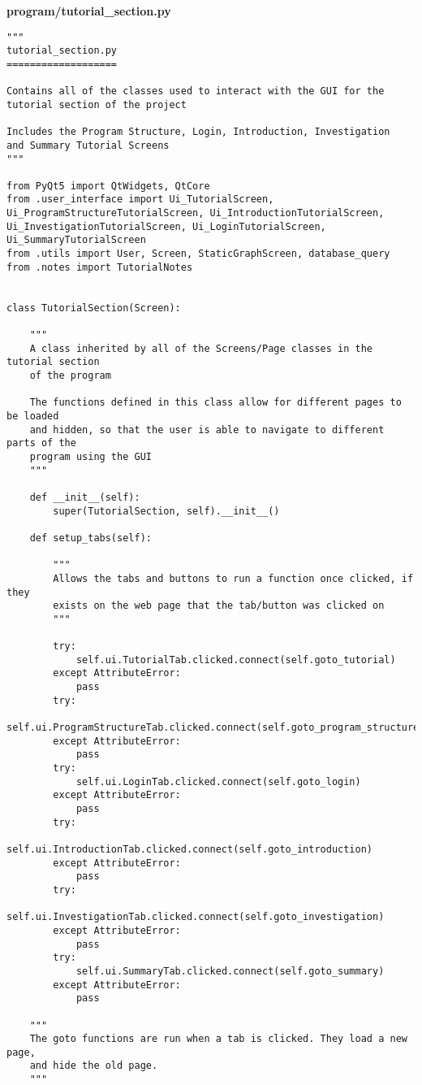 \documentclass{article}
\begin{document}
\textbf{program/tutorial\_section.py}

\begin{lstlisting}
"""
tutorial_section.py
===================

Contains all of the classes used to interact with the GUI for the
tutorial section of the project

Includes the Program Structure, Login, Introduction, Investigation
and Summary Tutorial Screens
"""

from PyQt5 import QtWidgets, QtCore
from .user_interface import Ui_TutorialScreen, Ui_ProgramStructureTutorialScreen, Ui_IntroductionTutorialScreen, Ui_InvestigationTutorialScreen, Ui_LoginTutorialScreen, Ui_SummaryTutorialScreen
from .utils import User, Screen, StaticGraphScreen, database_query
from .notes import TutorialNotes


class TutorialSection(Screen):

    """
    A class inherited by all of the Screens/Page classes in the tutorial section
    of the program

    The functions defined in this class allow for different pages to be loaded
    and hidden, so that the user is able to navigate to different parts of the
    program using the GUI
    """

    def __init__(self):
        super(TutorialSection, self).__init__()

    def setup_tabs(self):

        """
        Allows the tabs and buttons to run a function once clicked, if they
        exists on the web page that the tab/button was clicked on
        """

        try:
            self.ui.TutorialTab.clicked.connect(self.goto_tutorial)
        except AttributeError:
            pass
        try:
            self.ui.ProgramStructureTab.clicked.connect(self.goto_program_structure)
        except AttributeError:
            pass
        try:
            self.ui.LoginTab.clicked.connect(self.goto_login)
        except AttributeError:
            pass
        try:
            self.ui.IntroductionTab.clicked.connect(self.goto_introduction)
        except AttributeError:
            pass
        try:
            self.ui.InvestigationTab.clicked.connect(self.goto_investigation)
        except AttributeError:
            pass
        try:
            self.ui.SummaryTab.clicked.connect(self.goto_summary)
        except AttributeError:
            pass

    """
    The goto functions are run when a tab is clicked. They load a new page,
    and hide the old page.
    """


\end{lstlisting}
\end{document}
